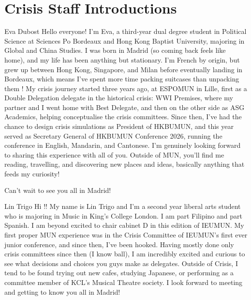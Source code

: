 \section{Crisis Staff Introductions}

\begin{chairletter}[Chair]{Eva Dubost}
Hello everyone! I'm Eva, a third-year dual degree student in Political Science at Sciences Po Bordeaux and Hong Kong Baptist University, majoring in Global and China Studies. I was born in Madrid (so coming back feels like home), and my life has been anything but stationary. I'm French by origin, but grew up between Hong Kong, Singapore, and Milan before eventually landing in Bordeaux, which means I've spent more time packing suitcases than unpacking them ! My crisis journey started three years ago, at ESPOMUN in Lille, first as a Double Delegation delegate in the historical crisis: WWI Premises, where my partner and I went home with Best Delegate, and then on the other side as ASG Academics, helping conceptualise the crisis committees. Since then, I've had the chance to design crisis simulations as President of HKBUMUN, and this year served as Secretary General of HKBUMUN Conference 2026, running the conference in English, Mandarin, and Cantonese. I'm genuinely looking forward to sharing this experience with all of you. Outside of MUN, you'll find me reading, travelling, and discovering new places and ideas, basically anything that feeds my curiosity!

Can't wait to see you all in Madrid!

\end{chairletter}

\begin{chairletter}[Co-Chair]{Lin Trigo}
Hi !! My name is Lin Trigo and I’m a second year liberal arts student who is majoring in Music in King’s College London. I am part Filipino and part Spanish. I am beyond excited to chair cabinet D in this edition of IEUMUN. My first proper MUN experience was in the Crisis Committee of IEUMUN’s first ever junior conference, and since then, I’ve been hooked. Having mostly done only crisis committees since then (I know ball), I am incredibly excited and curious to see what decisions and choices you guys make as delegates. Outside of Crisis, I tend to be found trying out new cafes, studying Japanese, or performing as a committee member of KCL’s Musical Theatre society. I look forward to meeting and getting to know you all in Madrid!

\end{chairletter}

